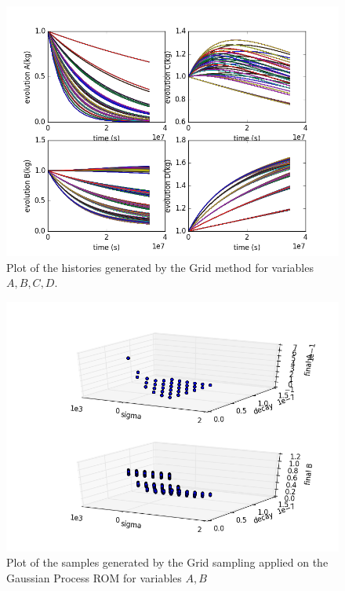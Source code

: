 \begin{enumerate}
\begin{figure}[h!]
  \includegraphics[scale=0.7]{pics/reducedOrderModelingHistoriesPhysicalModel.png}
  \caption{Plot of the histories generated by the Grid method for variables $A,B,C,D$.}
  \label{fig:ROMgrid_histories}
 \end{figure}
 \begin{figure}[h!]
  \centering
  \includegraphics[scale=0.7]{pics/samplesPlot3DROMgp_scatter-scatter.png}
  \caption{Plot of the samples generated by the Grid sampling applied on the Gaussian Process ROM for variables $A,B$}
  \label{fig:ROMgp_samples}
 \end{figure}

\end{enumerate}
